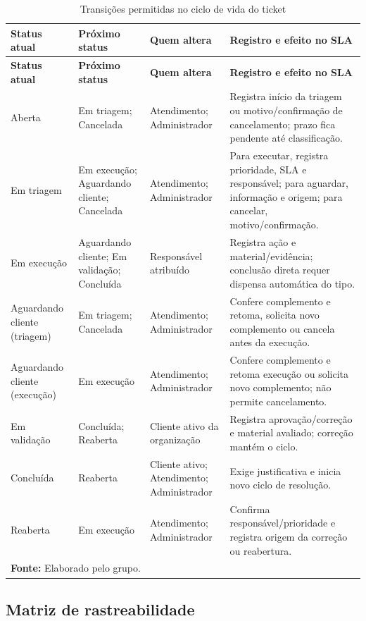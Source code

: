 \begin{longtable}{p{}p{}p{}p{}}
\caption{Transições permitidas no ciclo de vida do ticket}\label{tab:transicoes-status}\\
\hline
\textbf{Status atual} & \textbf{Próximo status} & \textbf{Quem altera} & \textbf{Registro e efeito no SLA} \\
\hline
\endfirsthead
\hline
\textbf{Status atual} & \textbf{Próximo status} & \textbf{Quem altera} & \textbf{Registro e efeito no SLA} \\
\hline
\endhead
Aberta & Em triagem; Cancelada & Atendimento; Administrador & Registra início da triagem ou motivo/confirmação de cancelamento; prazo fica pendente até classificação. \\
Em triagem & Em execução; Aguardando cliente; Cancelada & Atendimento; Administrador & Para executar, registra prioridade, SLA e responsável; para aguardar, informação e origem; para cancelar, motivo/confirmação. \\
Em execução & Aguardando cliente; Em validação; Concluída & Responsável atribuído & Registra ação e material/evidência; conclusão direta requer dispensa automática do tipo. \\
Aguardando cliente (triagem) & Em triagem; Cancelada & Atendimento; Administrador & Confere complemento e retoma, solicita novo complemento ou cancela antes da execução. \\
Aguardando cliente (execução) & Em execução & Atendimento; Administrador & Confere complemento e retoma execução ou solicita novo complemento; não permite cancelamento. \\
Em validação & Concluída; Reaberta & Cliente ativo da organização & Registra aprovação/correção e material avaliado; correção mantém o ciclo. \\
Concluída & Reaberta & Cliente ativo; Atendimento; Administrador & Exige justificativa e inicia novo ciclo de resolução. \\
Reaberta & Em execução & Atendimento; Administrador & Confirma responsável/prioridade e registra origem da correção ou reabertura. \\
\hline
\multicolumn{4}{l}{\footnotesize\textbf{Fonte:} Elaborado pelo grupo.}
\end{longtable}

\subsection{Matriz de rastreabilidade}


